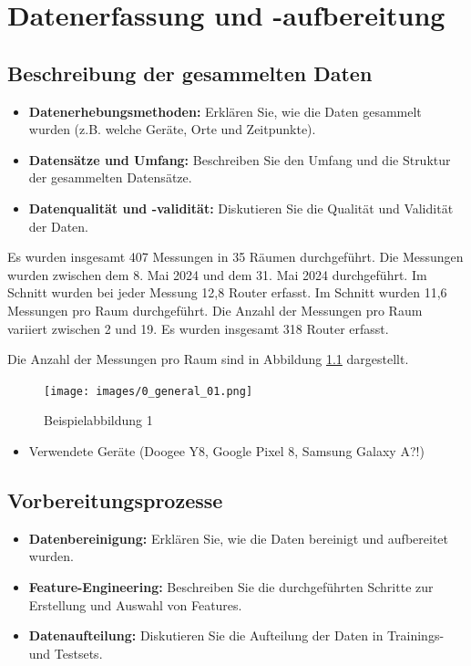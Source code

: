 \chapter{Datenerfassung und -aufbereitung}

\section{Beschreibung der gesammelten Daten}
\begin{itemize}
    \item \textbf{Datenerhebungsmethoden:} Erklären Sie, wie die Daten gesammelt wurden (z.B. welche Geräte, Orte und Zeitpunkte).
    \item \textbf{Datensätze und Umfang:} Beschreiben Sie den Umfang und die Struktur der gesammelten Datensätze.
    \item \textbf{Datenqualität und -validität:} Diskutieren Sie die Qualität und Validität der Daten.
\end{itemize}

Es wurden insgesamt 407 Messungen in 35 Räumen durchgeführt. Die Messungen wurden zwischen dem 8. Mai 2024 und dem 31. Mai 2024 durchgeführt. Im Schnitt wurden bei jeder Messung 12,8 Router erfasst. Im Schnitt wurden 11,6 Messungen pro Raum durchgeführt. Die Anzahl der Messungen pro Raum variiert zwischen 2 und 19. Es wurden insgesamt 318 Router erfasst.

Die Anzahl der Messungen pro Raum sind in Abbildung \ref{fig:0_general_01} dargestellt.

\begin{figure}[H]
    \centering
    \texttt{[image: images/0\_general\_01.png]}
    \caption{Beispielabbildung 1}
    \label{fig:0_general_01}
\end{figure}

\begin{itemize}
    \item Verwendete Geräte (Doogee Y8, Google Pixel 8, Samsung Galaxy A?!)
\end{itemize}

\section{Vorbereitungsprozesse}
\begin{itemize}
    \item \textbf{Datenbereinigung:} Erklären Sie, wie die Daten bereinigt und aufbereitet wurden.
    \item \textbf{Feature-Engineering:} Beschreiben Sie die durchgeführten Schritte zur Erstellung und Auswahl von Features.
    \item \textbf{Datenaufteilung:} Diskutieren Sie die Aufteilung der Daten in Trainings- und Testsets.
\end{itemize}

